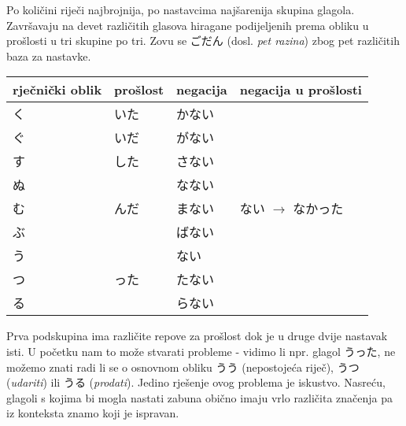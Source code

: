 
\author{Tomislav Mamić}

\usepackage{tikz}
\newcommand{\en}[1]{
	\begin{tikzpicture}[baseline=(C.base)]
		\node[draw,circle,inner sep=1pt](C){#1};
	\end{tikzpicture}
}


	
	
	Po količini riječi najbrojnija, po nastavcima najšarenija skupina glagola. Završavaju na devet različitih glasova hiragane podijeljenih prema obliku u prošlosti u tri skupine po tri. Zovu se ごだん (dosl. \textit{pet razina}) zbog pet različitih baza za nastavke.
	
	\begin{table}[h]
		\centering
		\begin{tabular}{l l l l}\toprule[2pt]
			rječnički oblik & prošlost & negacija & negacija u prošlosti\\
			\midrule
			く & いた & かない & \multirow{9}{90pt}{ない $\rightarrow$ なかった}\\
			ぐ & いだ & がない & \\\vspace{5pt}
			す & した & さない & \\
			ぬ & \multirow{3}{30pt}{んだ} & なない & \\
			む & & まない & \\\vspace{5pt}
			ぶ & & ばない & \\
			う & \multirow{3}{30pt}{った} & \en{わ}\hspace{-2pt}ない & \\
			つ & & たない & \\
			る & & らない & \\
			\bottomrule[2pt]
		\end{tabular}
	\end{table}

	Prva podskupina ima različite repove za prošlost dok je u druge dvije nastavak isti. U početku nam to može stvarati probleme - vidimo li npr. glagol うった, ne možemo znati radi li se o osnovnom obliku うう (nepostojeća riječ), うつ (\textit{udariti}) ili うる (\textit{prodati}). Jedino rješenje ovog problema je iskustvo. Nasreću, glagoli s kojima bi mogla nastati zabuna obično imaju vrlo različita značenja pa iz konteksta znamo koji je ispravan.
	
